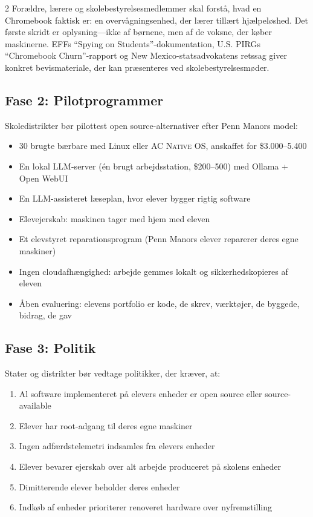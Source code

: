 \documentclass[11pt, a4paper]{article}
\newcommand{\acos}{\textsc{AC Native OS}}
\begin{document}
\begin{multicols}{2}
Forældre, lærere og skolebestyrelsesmedlemmer skal forstå, hvad en Chromebook faktisk er: en overvågningsenhed, der lærer tillært hjælpeløshed. Det første skridt er oplysning---ikke af børnene, men af de voksne, der køber maskinerne. EFFs ``Spying on Students''-dokumentation, U.S. PIRGs ``Chromebook Churn''-rapport og New Mexico-statsadvokatens retssag giver konkret bevismateriale, der kan præsenteres ved skolebestyrelsesmøder.

\subsection{Fase 2: Pilotprogrammer}

Skoledistrikter bør pilottest open source-alternativer efter Penn Manors model:

\begin{itemize}
  \item 30 brugte bærbare med Linux eller \acos{}, anskaffet for \$3.000--5.400
  \item En lokal LLM-server (én brugt arbejdsstation, \$200--500) med Ollama + Open WebUI
  \item En LLM-assisteret læseplan, hvor elever bygger rigtig software
  \item Elevejerskab: maskinen tager med hjem med eleven
  \item Et elevstyret reparationsprogram (Penn Manors elever reparerer deres egne maskiner)
  \item Ingen cloudafhængighed: arbejde gemmes lokalt og sikkerhedskopieres af eleven
  \item Åben evaluering: elevens portfolio er kode, de skrev, værktøjer, de byggede, bidrag, de gav
\end{itemize}

\subsection{Fase 3: Politik}

Stater og distrikter bør vedtage politikker, der kræver, at:

\begin{enumerate}
  \item Al software implementeret på elevers enheder er open source eller source-available
  \item Elever har root-adgang til deres egne maskiner
  \item Ingen adfærdstelemetri indsamles fra elevers enheder
  \item Elever bevarer ejerskab over alt arbejde produceret på skolens enheder
  \item Dimitterende elever beholder deres enheder
  \item Indkøb af enheder prioriterer renoveret hardware over nyfremstilling
\end{enumerate}


\end{multicols}
\end{document}
